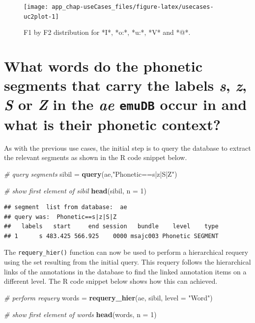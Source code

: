 \documentclass[]{book}
\newenvironment{Shaded}{\begin{snugshade}}{\end{snugshade}}
\newcommand{\CommentTok}[1]{\textcolor[rgb]{0.56,0.35,0.01}{\textit{#1}}}
\newcommand{\DataTypeTok}[1]{\textcolor[rgb]{0.13,0.29,0.53}{#1}}
\newcommand{\DecValTok}[1]{\textcolor[rgb]{0.00,0.00,0.81}{#1}}
\newcommand{\KeywordTok}[1]{\textcolor[rgb]{0.13,0.29,0.53}{\textbf{#1}}}
\newcommand{\NormalTok}[1]{#1}
\newcommand{\StringTok}[1]{\textcolor[rgb]{0.31,0.60,0.02}{#1}}
\theoremstyle{definition}
\theoremstyle{definition}
\theoremstyle{definition}
\theoremstyle{remark}
\begin{document}
\begin{figure}

{\centering \texttt{[image: app\_chap-useCases\_files/figure-latex/usecases-uc2plot-1]} 

}

\caption{F1 by F2 distribution for *I*, *o:*, *u:*, *V* and *@*.}\label{fig:usecases-uc2plot}
\end{figure}

\hypertarget{sec:app-chap-useCases-q3}{%
\section{\texorpdfstring{What words do the phonetic segments that carry
the labels \emph{s}, \emph{z}, \emph{S} or \emph{Z} in the \emph{ae}
\texttt{emuDB} occur in and what is their phonetic
context?}{What words do the phonetic segments that carry the labels s, z, S or Z in the ae emuDB occur in and what is their phonetic context?}}\label{sec:app-chap-useCases-q3}}

As with the previous use cases, the initial step is to query the
database to extract the relevant segments as shown in the R code snippet
below.

\begin{Shaded}
\begin{Highlighting}[]
\CommentTok{# query segments}
\NormalTok{sibil =}\StringTok{ }\KeywordTok{query}\NormalTok{(ae,}\StringTok{"Phonetic==s|z|S|Z"}\NormalTok{)}

\CommentTok{# show first element of sibil}
\KeywordTok{head}\NormalTok{(sibil, }\DataTypeTok{n =} \DecValTok{1}\NormalTok{)}
\end{Highlighting}
\end{Shaded}

\begin{verbatim}
## segment  list from database:  ae 
## query was:  Phonetic==s|z|S|Z 
##   labels   start     end session   bundle    level    type
## 1      s 483.425 566.925    0000 msajc003 Phonetic SEGMENT
\end{verbatim}

The \texttt{requery\_hier()} function can now be used to perform a
hierarchical requery using the set resulting from the initial query.
This requery follows the hierarchical links of the annotations in the
database to find the linked annotation items on a different level. The R
code snippet below shows how this can achieved.

\begin{Shaded}
\begin{Highlighting}[]
\CommentTok{# perform requery}
\NormalTok{words =}\StringTok{ }\KeywordTok{requery_hier}\NormalTok{(ae, sibil, }\DataTypeTok{level =} \StringTok{"Word"}\NormalTok{)}

\CommentTok{# show first element of words}
\KeywordTok{head}\NormalTok{(words, }\DataTypeTok{n =} \DecValTok{1}\NormalTok{)}
\end{Highlighting}
\end{Shaded}
\end{document}
